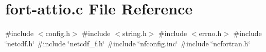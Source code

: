 \hypertarget{fort-attio_8c}{}\section{fort-\/attio.c File Reference}
\label{fort-attio_8c}
{\ttfamily \#include $<$config.\+h$>$}\newline
{\ttfamily \#include $<$string.\+h$>$}\newline
{\ttfamily \#include $<$errno.\+h$>$}\newline
{\ttfamily \#include \char`\"{}netcdf.\+h\char`\"{}}\newline
{\ttfamily \#include \char`\"{}netcdf\+\_\+f.\+h\char`\"{}}\newline
{\ttfamily \#include \char`\"{}nfconfig.\+inc\char`\"{}}\newline
{\ttfamily \#include \char`\"{}ncfortran.\+h\char`\"{}}\newline

